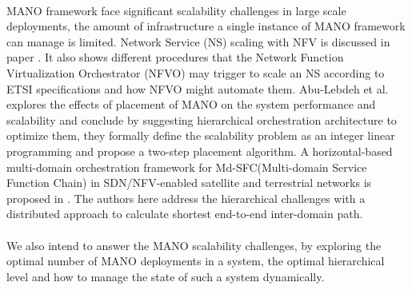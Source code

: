 \paragraph{}
MANO framework face significant scalability challenges in large scale deployments, the amount of infrastructure a single instance of MANO framework can manage is limited. Network Service (NS) scaling with NFV is discussed in paper \cite{adamuz2018automated}. It also shows different procedures that the Network Function Virtualization Orchestrator (NFVO) may trigger to scale an NS according to ETSI specifications and how NFVO might automate them. Abu-Lebdeh et al. \cite{abu-lebdeh_nfv_2017} explores the effects of placement of MANO on the system performance and scalability and conclude by suggesting hierarchical orchestration architecture to optimize them, they formally define the scalability problem as an integer linear programming and propose a two-step placement algorithm. 
A horizontal-based multi-domain orchestration framework for  Md-SFC(Multi-domain Service Function Chain) in SDN/NFV-enabled satellite and terrestrial networks is proposed in \cite{li_horizontal-based_2018}. The authors here address the hierarchical challenges with a distributed approach to calculate shortest end-to-end inter-domain path.  
\paragraph{}
We also intend to answer the MANO scalability challenges, by exploring the optimal number of MANO deployments in a system, the optimal hierarchical level and how to manage the state of such a system dynamically.
